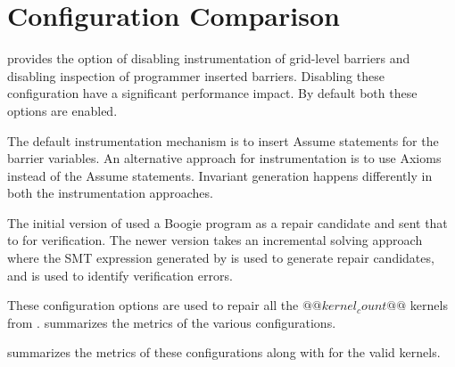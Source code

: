 \section{Configuration Comparison}

\tool provides the option of disabling instrumentation of grid-level barriers and disabling inspection of programmer inserted barriers. Disabling these configuration have a significant performance impact. By default both these options are enabled. 

The default instrumentation mechanism is to insert Assume statements for the barrier variables. An alternative approach for instrumentation is to use Axioms instead of the Assume statements. Invariant generation happens differently in both the instrumentation approaches.

The initial version of \tool used a Boogie program as a repair candidate and sent that to \verifier for verification. The newer version takes an incremental solving approach where the SMT expression generated by \verifier is used to generate repair candidates, and \zth is used to identify verification errors.

These configuration options are used to repair all the $@@kernel_count@@$ kernels from .  summarizes the metrics of the various configurations.



 summarizes the metrics of these configurations along with \autosync for the valid kernels.


